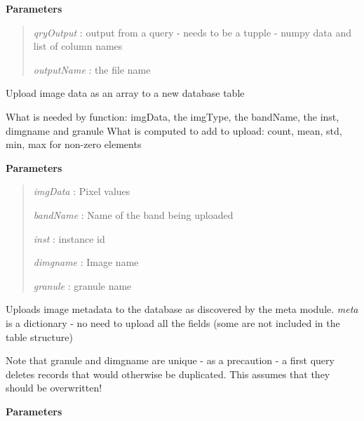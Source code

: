 \documentclass[letterpaper,10pt,openany,oneside]{sphinxmanual}
\begin{document}
\begin{fulllineitems}
\begin{fulllineitems}
\textbf{Parameters}
\begin{quote}

\emph{qryOutput}  : output from a query - needs to be a tupple - numpy data and list of column names

\emph{outputName} : the file name
\end{quote}

\end{fulllineitems}


\begin{fulllineitems}
\label{code:Database.Database.imgData2db}
Upload image data as an array to a new database table

What is needed by function: imgData, the imgType, the bandName, the inst, dimgname and granule        
What is computed to add to upload: count, mean, std, min, max for non-zero elements

\textbf{Parameters}
\begin{quote}

\emph{imgData}   : Pixel values

\emph{bandName}  : Name of the band being uploaded

\emph{inst}      : instance id

\emph{dimgname}  : Image name

\emph{granule}   : granule name
\end{quote}

\end{fulllineitems}


\begin{fulllineitems}
\label{code:Database.Database.meta2db}
Uploads image metadata to the database as discovered by the meta module.
\emph{meta} is a dictionary - no need to upload all the fields (some are not
included in the table structure)

Note that granule and dimgname are unique - as a precaution - a first query
deletes records that would otherwise be duplicated. 
This assumes that they should be overwritten!

\textbf{Parameters}
\begin{quote}


\end{quote}
\end{fulllineitems}
\end{fulllineitems}
\end{document}
